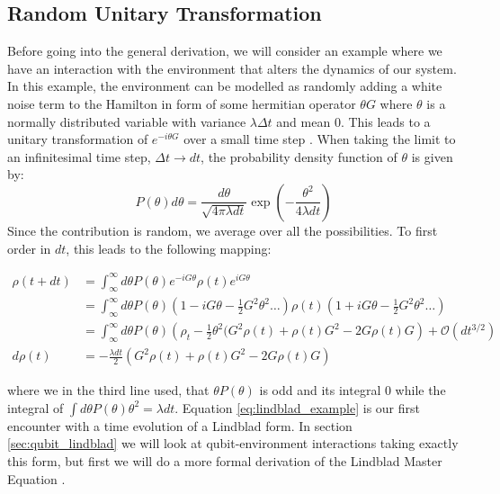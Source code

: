 \subsection{Random Unitary Transformation} \label{sec:random_unitary_transformation}
Before going into the general derivation, we will consider an example where we have an interaction with the environment that alters the dynamics of our system. In this example, the environment can be modelled as randomly adding a white noise term to the Hamilton in form of some hermitian operator $\theta G$ where $\theta$ is a normally distributed variable with variance $\lambda \Delta t$ and mean $0$. This leads to a unitary transformation of $e^{-i\theta G}$ over a small time step . When taking the limit to an infinitesimal time step, $\Delta t \to dt$, the probability density function of $\theta$ is given by:
\begin{equation}
    P(\theta) d\theta = \frac{d\theta}{\sqrt{4\pi\lambda dt}}\exp(-\frac{\theta^2}{4\lambda dt})
\end{equation}
Since the contribution is random, we average over all the possibilities. To first order in $dt$, this leads to the following mapping:
\begin{fullwidth}
\begin{align}
    \rho(t+dt)  &= \int_\infty^\infty d\theta P(\theta) e^{-iG\theta}\rho(t)e^{iG\theta}  \nonumber \\
                &= \int_\infty^\infty d\theta P(\theta) (1 - iG\theta  - \frac12 G^2\theta^2 \dots)\rho(t) (1 + iG\theta - \frac12 G^2\theta^2 \dots)  \nonumber \\
                &= \int_\infty^\infty d\theta P(\theta) \left(\rho_t - \frac12\theta^2(G^2\rho(t) + \rho(t)G^2 - 2 G\rho(t) G\right) + \mathcal{O}(dt^{3/2}) \nonumber \\
    d\rho(t)    &=  - \frac{\lambda dt}{2} \left(G^2\rho(t) + \rho(t)G^2 - 2 G\rho(t) G\right) \label{eq:lindblad_example}
\end{align}
\end{fullwidth}
where we in the third line used, that $\theta P(\theta)$ is odd and its integral $0$ while the integral of $\int d\theta P(\theta) \theta^2 = \lambda dt$. Equation \ref{eq:lindblad_example} is our first encounter with a time evolution of a Lindblad form. In section \ref{sec:qubit_lindblad} we will look at qubit-environment interactions taking exactly this form, but first we will do a more formal derivation of the Lindblad Master Equation \cite{pearle_simple_2012}.

